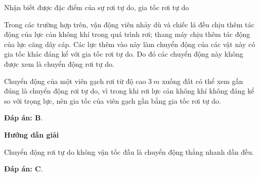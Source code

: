 \begin{dang}{Nhận biết được đặc điểm của sự rơi tự do, gia tốc rơi tự do}
{		Trong các trường hợp trên, vận động viên nhảy dù và chiếc lá đều chịu thêm tác động của lực cản không khí trong quá trình rơi; thang máy chịu thêm tác động của lực căng dây cáp. Các lực thêm vào này làm chuyển động của các vật này có gia tốc khác đáng kể với gia tốc rơi tự do. Do đó các  chuyển động này không được xem là chuyển động rơi tự do. 
		 
		Chuyển động của một viên gạch rơi từ độ cao $\SI{3}{m}$ xuống đất có thể xem gần đúng là chuyển động rơi tự do, vì trong khi rơi lực cản không khí không đáng kể so với trọng lực, nên gia tốc của viên gạch gần bằng gia tốc rơi tự do.
		
		\textbf{Đáp án: B}.
	}
	
	{	\begin{center}
			\textbf{Hướng dẫn giải}
		\end{center}
		
		Chuyển động rơi tự do không vận tốc đầu là chuyển động thẳng nhanh dần đều.
		
		\textbf{Đáp án: C}.
	}
	
\end{dang}
		
		
